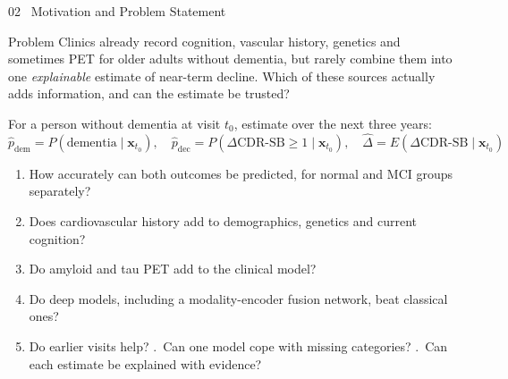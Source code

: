 \documentclass[aspectratio=169,11pt]{beamer}
\begin{document}
\begin{frame}{02 \textbar\ Motivation and Problem Statement}
\small
\begin{block}{Problem}
Clinics already record cognition, vascular history, genetics and sometimes PET for older adults without dementia, but rarely combine them into one \emph{explainable} estimate of near-term decline. Which of these sources actually adds information, and can the estimate be trusted?
\end{block}
\vspace{0.3em}
For a person without dementia at visit $t_0$, estimate over the next three years:
\[
\hat{p}_{\text{dem}} = P(\text{dementia} \mid \mathbf{x}_{t_0}), \quad
\hat{p}_{\text{dec}} = P(\Delta\text{CDR-SB} \geq 1 \mid \mathbf{x}_{t_0}), \quad
\hat{\Delta} = E(\Delta\text{CDR-SB} \mid \mathbf{x}_{t_0})
\]
\footnotesize
\begin{enumerate}
\setlength{\itemsep}{0pt}
\item How accurately can both outcomes be predicted, for normal and MCI groups separately?
\item Does cardiovascular history add to demographics, genetics and current cognition?
\item Do amyloid and tau PET add to the clinical model?
\item Do deep models, including a modality-encoder fusion network, beat classical ones?
\item Do earlier visits help? .\ Can one model cope with missing categories? .\ Can each estimate be explained with evidence?
\end{enumerate}
\end{frame}
\end{document}
